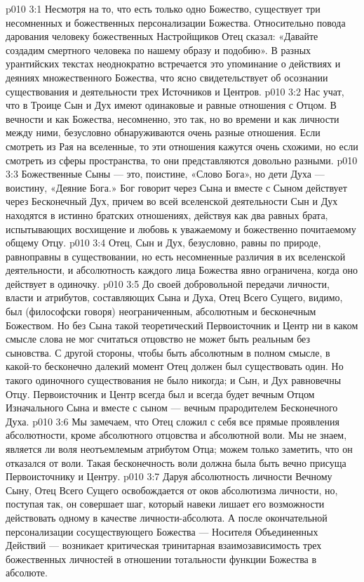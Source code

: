\vs p010 3:1 Несмотря на то, что есть только одно Божество, существует три несомненных и божественных персонализации Божества. Относительно повода дарования человеку божественных Настройщиков Отец сказал: «Давайте создадим смертного человека по нашему образу и подобию». В разных урантийских текстах неоднократно встречается это упоминание о действиях и деяниях множественного Божества, что ясно свидетельствует об осознании существования и деятельности трех Источников и Центров.
\vs p010 3:2 \pc Нас учат, что в Троице Сын и Дух имеют одинаковые и равные отношения с Отцом. В вечности и как Божества, несомненно, это так, но во времени и как личности между ними, безусловно обнаруживаются очень разные отношения. Если смотреть из Рая на вселенные, то эти отношения кажутся очень схожими, но если смотреть из сферы пространства, то они представляются довольно разными.
\vs p010 3:3 Божественные Сыны --- это, поистине, «Слово Бога», но дети Духа --- воистину, «Деяние Бога.» Бог говорит через Сына и вместе с Сыном действует через Бесконечный Дух, причем во всей вселенской деятельности Сын и Дух находятся в истинно братских отношениях, действуя как два равных брата, испытывающих восхищение и любовь к уважаемому и божественно почитаемому общему Отцу.
\vs p010 3:4 Отец, Сын и Дух, безусловно, равны по природе, равноправны в существовании, но есть несомненные различия в их вселенской деятельности, и абсолютность каждого лица Божества явно ограничена, когда оно действует в одиночку.
\vs p010 3:5 \pc До своей добровольной передачи личности, власти и атрибутов, составляющих Сына и Духа, Отец Всего Сущего, видимо, был (философски говоря) неограниченным, абсолютным и бесконечным Божеством. Но без Сына такой теоретический Первоисточник и Центр ни в каком смысле слова не мог считаться  отцовство не может быть реальным без сыновства. С другой стороны, чтобы быть абсолютным в полном смысле, в какой\hyp{}то бесконечно далекий момент Отец должен был существовать один. Но такого одиночного существования не было никогда; и Сын, и Дух равновечны Отцу. Первоисточник и Центр всегда был и всегда будет вечным Отцом Изначального Сына и вместе с сыном --- вечным прародителем Бесконечного Духа.
\vs p010 3:6 Мы замечаем, что Отец сложил с себя все прямые проявления абсолютности, кроме абсолютного отцовства и абсолютной воли. Мы не знаем, является ли воля неотъемлемым атрибутом Отца; можем только заметить, что он  отказался от воли. Такая бесконечность воли должна была быть вечно присуща Первоисточнику и Центру.
\vs p010 3:7 Даруя абсолютность личности Вечному Сыну, Отец Всего Сущего освобождается от оков абсолютизма личности, но, поступая так, он совершает шаг, который навеки лишает его возможности действовать одному в качестве личности\hyp{}абсолюта. А после окончательной персонализации сосуществующего Божества --- Носителя Объединенных Действий --- возникает критическая тринитарная взаимозависимость трех божественных личностей в отношении тотальности функции Божества в абсолюте.
